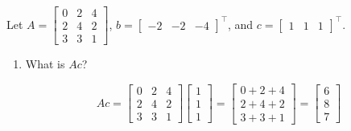 \documentclass{article}
\begin{document}
\begin{aprob}\label{prob:linsystem}
    Let $A = \begin{bmatrix} 0 & 2 & 4 \\ 2 & 4 & 2 \\ 3 & 3 & 1 \end{bmatrix}$, $b = \begin{bmatrix} -2 & -2 & -4 \end{bmatrix}^\top$, and $c=\begin{bmatrix} 1 & 1 & 1 \end{bmatrix}^\top$.
    \begin{enumerate}
    	\item {} What is $Ac$?
    	
    	\begin{equation}
    	Ac = \begin{bmatrix} 0 & 2 & 4 \\ 2 & 4 & 2 \\ 3 & 3 & 1 \end{bmatrix}\begin{bmatrix} 1 \\ 1 \\ 1 \end{bmatrix} = \begin{bmatrix} 0 + 2 + 4 \\ 2 + 4 + 2 \\ 3 + 3 + 1 \end{bmatrix} = \begin{bmatrix} 6 \\ 8 \\ 7 \end{bmatrix}
    	\end{equation}
    	

\end{enumerate}
\end{aprob}
\end{document}
